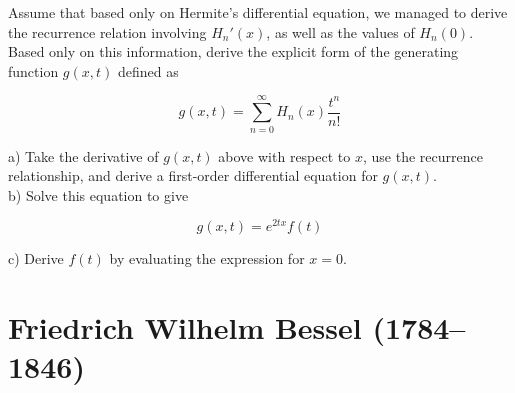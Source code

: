 \begin{sidebar}
\begin{ex}
Assume that based only on Hermite's differential equation, we managed to derive the recurrence relation involving $H_n'(x)$, as well as the values of $H_n(0)$. Based only on this information, derive the explicit form of the generating function $g(x,t)$ defined as

$$g(x,t) = \sum_{n = 0}^{\infty} H_n(x)\frac{t^n}{n!} $$

a) Take the derivative of $g(x,t)$ above with respect to $x$, use the recurrence relationship, and derive a first-order differential equation for $g(x,t)$.\\

b) Solve this equation to give

$$g(x,t) = e^{2tx} f(t)$$

c) Derive $f(t)$ by evaluating the expression for $x=0$.
\end{ex}
\end{sidebar}

\pagebreak
\section*{Friedrich Wilhelm Bessel (1784--1846)}


